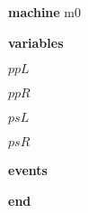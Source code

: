 \begin{block}
  \item   \textbf{machine} m0
  \item   \textbf{variables}
  \begin{block}
    \item   $ppL$
    \item   $ppR$
    \item   $psL$
    \item   $psR$
  \end{block}
  \item   
  \item   
  \item   \textbf{events}
  \begin{block}
    \item   
    \item   
    \item   
    \item   
    \item   
    \item   
    \item   
    \item   
  \end{block}
  \item   \textbf{end} \\
\end{block}
